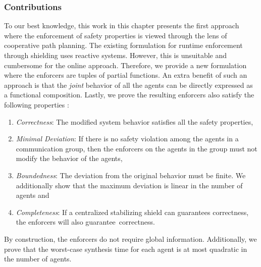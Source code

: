 \subsubsection*{Contributions} To our best knowledge, this work in this chapter presents the first approach where the enforcement of safety properties is viewed through the lens of cooperative path planning. The existing formulation for runtime enforcement through shielding uses reactive systems. However, this is unsuitable and cumbersome for the online approach.  Therefore, we provide a new formulation where the enforcers are tuples of partial functions. An extra benefit of such an approach is that the \emph{joint} behavior of all the agents can be directly expressed as a functional composition. Lastly, we prove the resulting enforcers also satisfy the following properties \cite{bloem2014sat}:
\begin{enumerate}
    \item \emph{Correctness}: The modified system behavior satisfies all the safety properties,
    \item \emph{Minimal Deviation}:  If there is no safety violation among the agents in a communication group, then the enforcers on the agents in the group must not modify the behavior of the agents,
    \item \emph{Boundedness}:  The deviation from the original behavior must be finite. We additionally show that the maximum deviation is linear in the number of agents and
    \item \emph{Completeness}:  If a centralized stabilizing shield can guarantees correctness, the enforcers will also guarantee~correctness. 
\end{enumerate}
By construction, the enforcers do not require global information. Additionally, we prove that the worst-case synthesis time for each agent is at most quadratic in the number of agents.  

